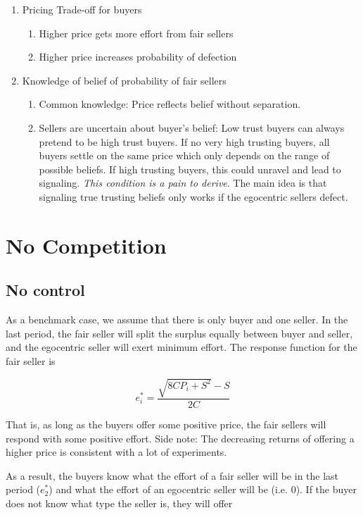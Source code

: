 \documentclass{article}
\begin{document}
\begin{enumerate}
    \item Pricing Trade-off for buyers
    \begin{enumerate}
        \item Higher price gets more effort from fair sellers
        \item Higher price increases probability of defection
    \end{enumerate}
    \item Knowledge of belief of probability of fair sellers
    \begin{enumerate}
        \item Common knowledge: Price reflects belief without separation. 
        \item Sellers are uncertain about buyer's belief: Low trust buyers can always pretend to be high trust buyers. If no very high trusting buyers, all buyers settle on the same price which only depends on the range of possible beliefs. If high trusting buyers, this could unravel and lead to signaling. \emph{This condition is a pain to derive}. The main idea is that signaling true trusting beliefs only works if the egocentric sellers defect.
    \end{enumerate}
\end{enumerate}
    

\section{No Competition}

\subsection{No control}

As a benchmark case, we assume that there is only buyer and one seller. In the last period, the fair seller will split the surplus equally between buyer and seller, and the egocentric seller will exert minimum effort. The response function for the fair seller is 

$$
e^*_i = \frac{\sqrt{8CP_i + S^2} - S}{2C}
$$

That is, as long as the buyers offer some positive price, the fair sellers will respond with some positive effort. Side note: The decreasing returns of offering a higher price is consistent with a lot of experiments.

As a result, the buyers know what the effort of a fair seller will be in the last period ($e^*_2$) and what the effort of an egocentric seller will be (i.e. $0$). If the buyer does not know what type the seller is, they will offer 
\end{document}

